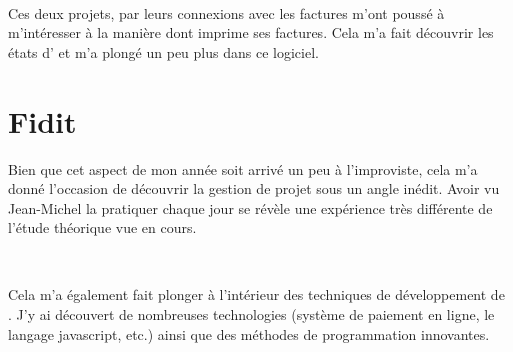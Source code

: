 ~

Ces deux projets, par leurs connexions avec les factures m'ont poussé à m'intéresser à la manière dont \integrale{} imprime ses factures. Cela m'a fait découvrir les \og états \fg{} d' et m'a plongé un peu plus dans ce logiciel.

\section{Fidit}
Bien que cet aspect de mon année soit arrivé un peu à l'improviste, cela m'a donné l'occasion de découvrir la gestion de projet sous un angle inédit. Avoir vu Jean-Michel  la pratiquer chaque jour se révèle une expérience très différente de l'étude théorique vue en cours.

~

Cela m'a également fait plonger à l'intérieur des techniques de développement de \fidit. J'y ai découvert de nombreuses technologies (système de paiement en ligne, le langage javascript, etc.) ainsi que des méthodes de programmation innovantes.
